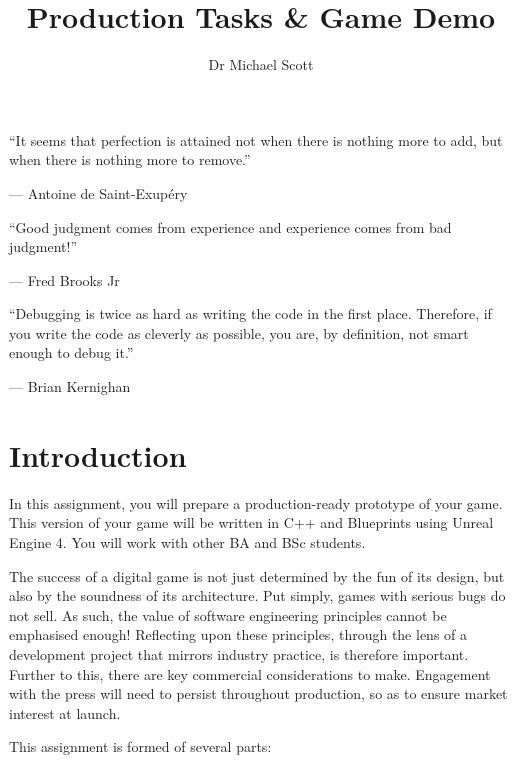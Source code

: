 \documentclass{../fal_assignment}
\title{Production Tasks \& Game Demo}
\author{Dr Michael Scott}
\begin{document}
\maketitle

\begin{marginquote}
    ``It seems that perfection is attained not when there is nothing more to add,
        but when there is nothing more to remove.''
    
    --- Antoine de Saint-Exup\'ery
    
    \marginquoterule
    
    ``Good judgment comes from experience and experience comes from bad judgment!''
    
    --- Fred Brooks Jr
    
    \marginquoterule
    
    ``Debugging is twice as hard as writing the code in the first place.
     Therefore, if you write the code as cleverly as possible, you are, by definition, not smart enough to debug it.'' 
 
         --- Brian Kernighan
     
\end{marginquote}

\section*{Introduction}

In this assignment, you will prepare a production-ready prototype of your game. This version of your game will be written in C++ and Blueprints using Unreal Engine 4. You will work with other BA and BSc students.

The success of a digital game is not just determined by the fun of its design, but also by the soundness of its architecture. Put simply, games with serious bugs do not sell. As such, the value of software engineering principles cannot be emphasised enough! Reflecting upon these principles, through the lens of a development project that mirrors industry practice, is therefore important. Further to this, there are key commercial considerations to make. Engagement with the press will need to persist throughout production, so as to ensure market interest at launch.

This assignment is formed of several parts:
\end{document}
